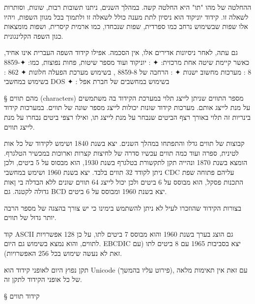 ההחלטה של מהו "תו" היא החלטה קשה. במהלך השנים, ניתנו תשובות רבות, שונות, וסותרות לשאלה זו. קידוד יוניקוד הוא ניסיון לתת מענה כולל לשאלה זו ולתמוך בכל מגוון השפות, ויהיו אלו שפות שבשימוש נרחב כמו ספרדית, שפות שנכחדו, כמו ארמית קיסרית, ושפות מומצאות כגון השפה הקלינגונית.
  
גם עתה, לאחר ניסיונות אדירים אלו, אין הסכמה. אפילו קידוד השפה העברית אינו אחיד, כאשר קיימת שיטה אחת מרכזית:
✦ : יוניקוד
ועוד מספר שיטות, פחות נפוצות, כמו:
✦8859-8  : מערכות מחשוב ישנות
✦ : הרחבה של 8859-8  , בשימוש מערכת הפעלה חלונות
✦ 862 : בשימוש במחשבי DOS
✦ : בשימוש במחשבים של חברת אפל

§ מהם תווים (characters)
מספר התווים שניתן לייצג תלוי במערכת הקידוד בה משתמשים על מנת לייצג אותם. מערכות קידוד שונות יכולות לייצג מספר שונה של תווים. במערכות קידוד בינריות זה תלוי באורך רצף הביטים שנבחר על מנת לייצג תו, ואילו רצפי ביטים נבחרו על מנת לייצג תווים.
  
קבוצות של תווים גדלו והתפתחו במהלך השנים.  יצא בשנת 1840 ושימש לקידוד של כל אות לטינית, ספרה ועוד כמה תווים עכשיו סדרה של לחיצות קצרות וארוכות במכשיר הטלגרף.  הומצא בשנת 1870 ונהייה תקן לתקשורת בטלגרף בשנת 1930, הוא מבסוס על 5 ביטים, ולכן ניתן לקודד 32 תווים בלבד.  יצא בשנת 1960 ושימש במחשבי CDC עליהם פתוחה שפת התכנות פסקל, הוא מבוסס על 6 ביטים ולכן יכול לייצג 64 תווים שונים ללא הבדלה בי ןאות גדולה לקטנה. גם BCD יצא בשנת 1960 ומבוסס על 6 ביטים.
  
בצורות הקידוד שהוזכרו לעיל לא ניתן להשתמש בימינו כי יש צורך בהצגה של מספר הרבה יותר גדול של תווים.
  
קוד ASCII גם הוצג בערך בשנת 1960 והוא מבוסס 7 ביטים לתו, על כן 128 אפשרויות לתווים, והוא נמצא בשימוש גם היום. EBCDIC יצא בסביבות 1965 עם 8 ביטים לתו (עם זאת לא נעשה שימוש בכל 256 האפשרויות).
  
תקן נפוץ היום לאופני קידוד הוא Unicode (פירוט עליו בהמשך), עם זאת אין תאימות מלאה של כל אופני הקידוד לתקן זה.

§ קידוד תווים
